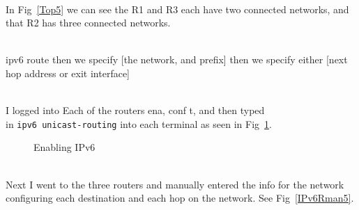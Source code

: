 \documentclass[../EngineeringJournal_CDavis.tex]{subfiles}
\begin{document}
\\ In Fig~\ref{Top5} we can see the R1 and R3 each have two connected networks, and that R2 has three connected networks.

\\ ipv6 route then we specify [the network, and  prefix] then we specify either [next hop address or exit interface]


\noindent{}
\\I logged into Each of the routers ena, conf t, and then typed 
\\in \verb$ipv6 unicast-routing$ into each terminal as seen in Fig~\ref{Enable5V6}.

\begin{figure}[!hbt]\centering
{}\hfill
{}\par 
{}
\caption{Enabling IPv6}
\label{Enable5V6}
\end{figure}

\clearpage

\noindent{}
\\ Next I went to the three routers and manually entered the info for the network
configuring each destination and each hop on the network. See Fig~\ref{IPv6Rman5}.
\end{document}
